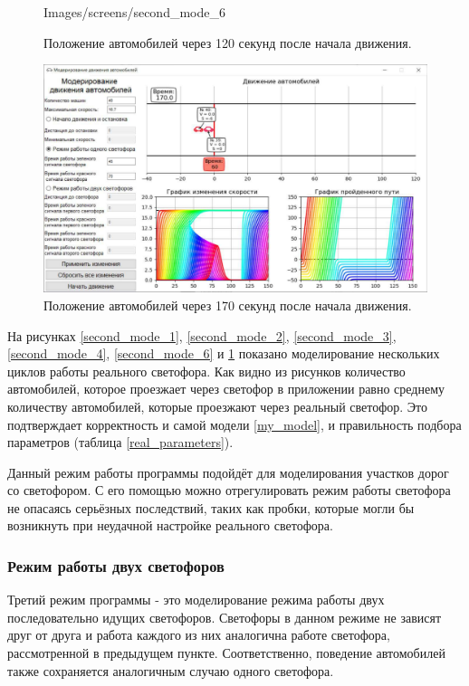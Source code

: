 \documentclass[12pt, a4paper]{extarticle}
\numberwithin{equation}{section}
\numberwithin{figure}{section}
\begin{document}
\begin{figure}[h!]
\begin{center}
\begin{minipage}[h]{0.48\linewidth}
			{Images/screens/second_mode_6}
			\caption{Положение автомобилей через 120 секунд после начала движения.}
			\label{second_mode_6}
		\end{minipage}
		\hfill
		\begin{minipage}[h]{0.48\linewidth}
			\includegraphics[width=1\linewidth]
			{Images/screens/second_mode_9}
			\caption{Положение автомобилей через 170 секунд после начала движения.} 
			\label{second_mode_9}
		\end{minipage}
	\end{center}
\end{figure}

На рисунках \ref{second_mode_1}, \ref{second_mode_2}, \ref{second_mode_3}, \ref{second_mode_4}, \ref{second_mode_6} и \ref{second_mode_9} показано моделирование нескольких циклов работы реального светофора. Как видно из рисунков количество автомобилей, которое проезжает через светофор в приложении равно среднему количеству автомобилей, которые проезжают через реальный светофор. Это подтверждает корректность и самой модели \eqref{my_model}, и правильность подбора параметров (таблица \ref{real_parameters}). 

Данный режим работы программы подойдёт для моделирования участков дорог со светофором. С его помощью можно отрегулировать режим работы светофора не опасаясь серьёзных последствий, таких как пробки, которые могли бы возникнуть при неудачной настройке реального светофора.  

\subsubsection{Режим работы двух светофоров}

Третий режим программы - это моделирование режима работы двух последовательно идущих светофоров. Светофоры в данном режиме не зависят друг от друга и работа каждого из них аналогична работе светофора, рассмотренной в предыдущем пункте. Соответственно, поведение автомобилей также сохраняется аналогичным случаю одного светофора.
\end{document}

